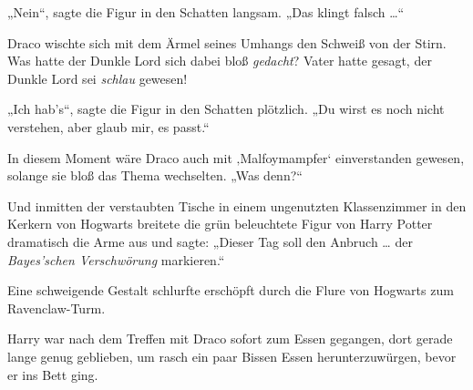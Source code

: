 „Nein“, sagte die Figur in den Schatten langsam.
„Das klingt falsch …“

Draco wischte sich mit dem Ärmel seines Umhangs den Schweiß von der Stirn. Was hatte der Dunkle Lord sich dabei bloß \emph{gedacht}? Vater hatte gesagt, der Dunkle Lord sei \emph{schlau} gewesen!

„Ich hab’s“, sagte die Figur in den Schatten plötzlich.
„Du wirst es noch nicht verstehen, aber glaub mir, es passt.“

In diesem Moment wäre Draco auch mit ‚Malfoymampfer‘ einverstanden gewesen, solange sie bloß das Thema wechselten.
„Was denn?“

Und inmitten der verstaubten Tische in einem ungenutzten Klassenzimmer in den Kerkern von Hogwarts breitete die grün beleuchtete Figur von Harry Potter dramatisch die Arme aus und sagte:
„Dieser Tag soll den Anbruch … der \emph{Bayes’schen Verschwörung} markieren.“

\later

Eine schweigende Gestalt schlurfte erschöpft durch die Flure von Hogwarts zum Ravenclaw-Turm.

Harry war nach dem Treffen mit Draco sofort zum Essen gegangen, dort gerade lange genug geblieben, um rasch ein paar Bissen Essen herunterzuwürgen, bevor er ins Bett ging.

